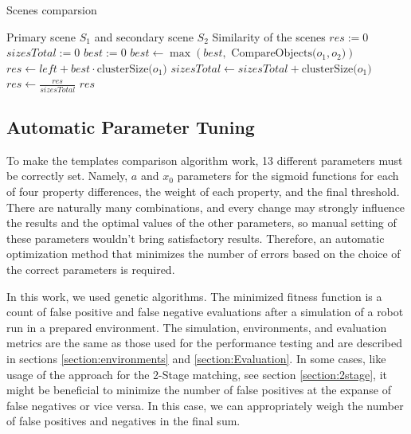 \begin{algorithm}
    \caption{Scenes comparsion}\label{alg:scenesSimilarityCalc}
    \begin{algorithmic}
        \Require Primary scene $S_1$ and secondary scene $S_2$
        \Ensure Similarity of the scenes
        \State $res := 0$
        \State $sizesTotal := 0$
        \State $best := 0$
        \State $best \leftarrow \max(best,\text{ CompareObjects($o_1,o_2$)})$
        \EndFor
        \State $res \leftarrow left + best \cdot \text{clusterSize($o_1$)}$
        \State $sizesTotal \leftarrow sizesTotal + \text{clusterSize($o_1$)}$
        \EndFor
        \State $res \leftarrow \frac{res}{sizesTotal}$
        \State\Return $res$
    \end{algorithmic}
\end{algorithm}

\subsection{Automatic Parameter Tuning}\label{section:parameterTuning}

To make the templates comparison algorithm work, 13 different parameters must be correctly set. Namely, $a$ and $x_0$ parameters for the sigmoid functions for each of four property differences, the weight of each property, and the final threshold. There are naturally many combinations, and every change may strongly influence the results and the optimal values of the other parameters, so manual setting of these parameters wouldn't bring satisfactory results. Therefore, an automatic optimization method that minimizes the number of errors based on the choice of the correct parameters is required.\par
In this work, we used genetic algorithms\cite{geneticAlg}. The minimized fitness function is a count of false positive and false negative evaluations after a simulation of a robot run in a prepared environment. The simulation, environments, and evaluation metrics are the same as those used for the performance testing and are described in sections \ref{section:environments} and \ref{section:Evaluation}. In some cases, like usage of the approach for the 2-Stage matching, see section \ref{section:2stage}, it might be beneficial to minimize the number of false positives at the expanse of false negatives or vice versa. In this case, we can appropriately weigh the number of false positives and negatives in the final sum.